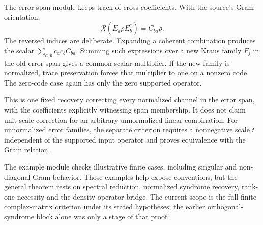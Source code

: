 The error-span module keeps track of cross coefficients. With the source's Gram orientation,
\[
\mathcal R(E_a\rho E_b^*)=C_{ba}\rho.
\]
The reversed indices are deliberate. Expanding a coherent combination produces the scalar $\sum_{a,b}c_a\overline{c_b}C_{ba}$. Summing such expressions over a new Kraus family $F_j$ in the old error span gives a common scalar multiplier. If the new family is normalized, trace preservation forces that multiplier to one on a nonzero code. The zero-code case again has only the zero supported operator.


This is one fixed recovery correcting every normalized channel in the error span, with the coefficients explicitly witnessing span membership. It does not claim unit-scale correction for an arbitrary unnormalized linear combination. For unnormalized error families, the separate criterion requires a nonnegative scale $t$ independent of the supported input operator and proves equivalence with the Gram relation.


The example module checks illustrative finite cases, including singular and non-diagonal Gram behavior. Those examples help expose conventions, but the general theorem rests on spectral reduction, normalized syndrome recovery, rank-one necessity and the density-operator bridge. The current scope is the full finite complex-matrix criterion under its stated hypotheses; the earlier orthogonal-syndrome block alone was only a stage of that proof.
